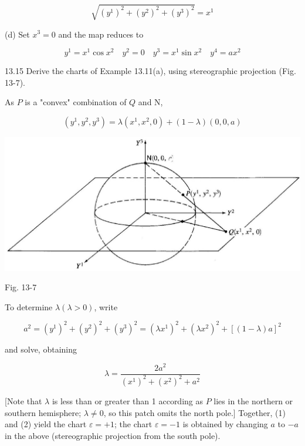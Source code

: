 \documentclass[10pt]{article}
\begin{document}
$$
\sqrt{\left(y^{1}\right)^{2}+\left(y^{2}\right)^{2}+\left(y^{3}\right)^{2}}=x^{1}
$$

(d) Set $x^{3}=0$ and the map reduces to

$$
y^{1}=x^{1} \cos x^{2} \quad y^{2}=0 \quad y^{3}=x^{1} \sin x^{2} \quad y^{4}=a x^{2}
$$

13.15 Derive the charts of Example 13.11(a), using stereographic projection (Fig. 13-7).

As $P$ is a "convex" combination of $Q$ and $\mathrm{N}$,


\begin{equation*}
\left(y^{1}, y^{2}, y^{3}\right)=\lambda\left(x^{1}, x^{2}, 0\right)+(1-\lambda)(0,0, a) \tag{1}
\end{equation*}


\begin{center}
\includegraphics[max width=\textwidth]{2024_04_03_41f90be4f896e21f0dc9g-215}
\end{center}

Fig. 13-7

To determine $\lambda(\lambda>0)$, write

$$
a^{2}=\left(y^{1}\right)^{2}+\left(y^{2}\right)^{2}+\left(y^{3}\right)^{2}=\left(\lambda x^{1}\right)^{2}+\left(\lambda x^{2}\right)^{2}+[(1-\lambda) a]^{2}
$$

and solve, obtaining


\begin{equation*}
\lambda=\frac{2 a^{2}}{\left(x^{1}\right)^{2}+\left(x^{2}\right)^{2}+a^{2}} \tag{2}
\end{equation*}


[Note that $\lambda$ is less than or greater than 1 according as $P$ lies in the northern or southern hemisphere; $\lambda \neq 0$, so this patch omits the north pole.] Together, (1) and (2) yield the chart $\varepsilon=+1$; the chart $\varepsilon=-1$ is obtained by changing $a$ to $-a$ in the above (stereographic projection from the south pole).
\end{document}
